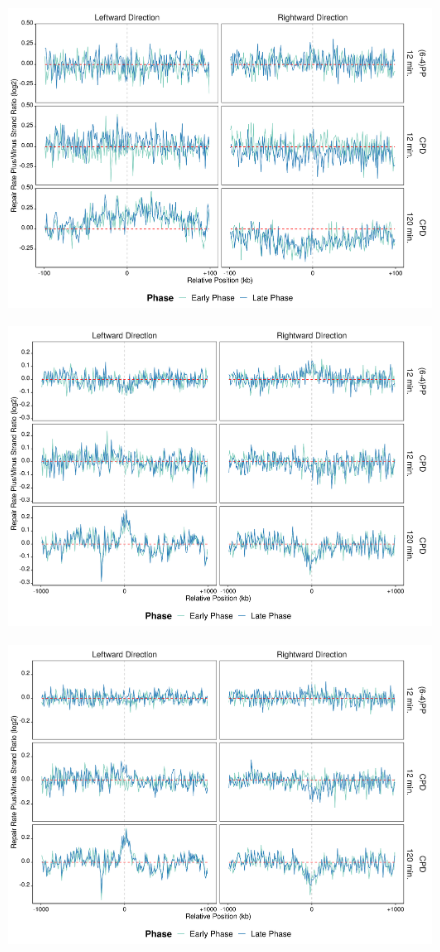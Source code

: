 \begin{figure}[H]
\begin{center}
\includegraphics[width=\textwidth]{Chapters/7_appendix/figures/supfig77}
\caption[]{}
\label{supfig:}
\end{center}
\end{figure}

\begin{figure}[H]
\begin{center}
\includegraphics[width=\textwidth]{Chapters/7_appendix/figures/supfig78}
\caption[]{}
\label{supfig:}
\end{center}
\end{figure}

\begin{figure}[H]
\begin{center}
\includegraphics[width=\textwidth]{Chapters/7_appendix/figures/supfig79}
\caption[]{}
\label{supfig:}
\end{center}
\end{figure}
